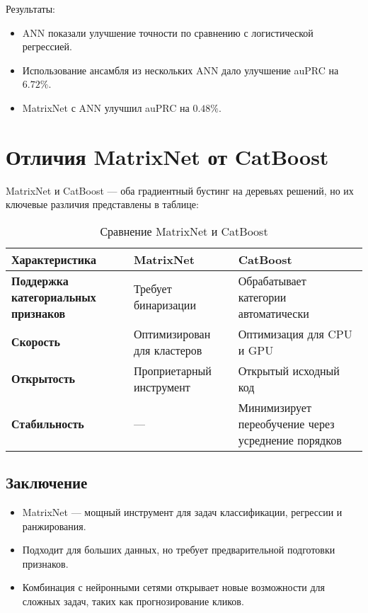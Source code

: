 Результаты:
\begin{itemize}
    \item ANN показали улучшение точности по сравнению с логистической регрессией.
    \item Использование ансамбля из нескольких ANN дало улучшение auPRC на $6.72\%$.
    \item MatrixNet с ANN улучшил auPRC на $0.48\%$.
\end{itemize}

\section{Отличия MatrixNet от CatBoost}
MatrixNet и CatBoost — оба градиентный бустинг на деревьях решений, но их ключевые различия представлены в таблице:\\

\begin{table}[h!]
\centering
\renewcommand{\arraystretch}{1.2}
\setlength{\tabcolsep}{8pt} 
\begin{tabular}{|p{3.5cm}|p{4.5cm}|p{4.5cm}|} 
\hline
\textbf{Характеристика} & \textbf{MatrixNet} & \textbf{CatBoost} \\ \hline
\textbf{Поддержка категориальных признаков} & Требует бинаризации & Обрабатывает категории автоматически \\ \hline
\textbf{Скорость} & Оптимизирован для кластеров & Оптимизация для CPU и GPU \\ \hline
\textbf{Открытость} & Проприетарный инструмент & Открытый исходный код \\ \hline
\textbf{Стабильность} & --- & Минимизирует переобучение через усреднение порядков \\ \hline
\end{tabular}
\caption{Сравнение MatrixNet и CatBoost}
\label{tab:matrixnet_vs_catboost}
\end{table}

\subsection{Заключение}
\begin{itemize}
    \item MatrixNet — мощный инструмент для задач классификации, регрессии и ранжирования.
    \item Подходит для больших данных, но требует предварительной подготовки признаков.
    \item Комбинация с нейронными сетями открывает новые возможности для сложных задач, таких как прогнозирование кликов.
\end{itemize}

